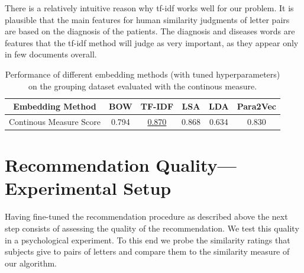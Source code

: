 There is a relatively intuitive reason why tf-idf works well for our problem. It is plausible that the main features for human similarity judgments of letter pairs are based on the diagnosis of the patients. The diagnosis and diseases words are features that the tf-idf method will judge as very important, as they appear only in few documents overall. %
\begin{table}
	\begin{tabular}{|c||c|c|c|c|c|}
		\hline 
		Embedding Method & BOW & TF-IDF & LSA & LDA  & Para2Vec\tabularnewline
		\hline 
		\hline 
		Continous Measure Score & 0.794 & \underline{0.870} & 0.868 & 0.634 & 0.830\tabularnewline
		\hline 
	\end{tabular}
	\caption{Performance of different embedding methods (with tuned hyperparameters) on the grouping dataset evaluated with the continous measure.}
	\label{table:continuous_measure}
\end{table}



\section{Recommendation Quality---Experimental Setup}
Having fine-tuned the recommendation procedure as described above the next step consists of assessing the quality of the recommendation. We test this quality in a psychological experiment. To this end we probe the similarity ratings that subjects give to pairs of letters and compare them to the similarity measure of our algorithm.

